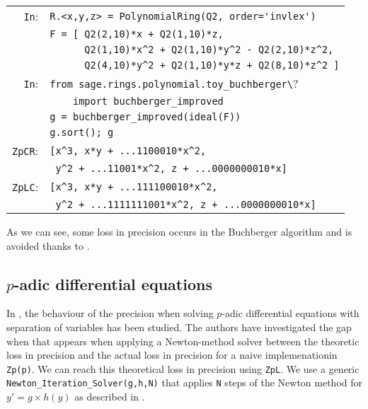 \documentclass[sigconf]{acmart}
\newcommand{\ZpFP}{\text{\color{output} \rm \tt ZpFP}\xspace}
\newcommand{\ZpL}{\text{\color{output} \rm \tt ZpL}\xspace}
\newcommand{\cIn}{{\color{input} \tt \phantom{Zp}In}:}
\newcommand{\cZpCR}{{\color{output} \tt ZpCR}:}
\newcommand{\cZpLC}{{\color{output} \tt ZpLC}:}
\theoremstyle{definition}
\begin{document}
{\noindent \small
\begin{tabular}{@{}rl}
\cIn
 & \verb?R.<x,y,z> = ?{\color{constructor}\verb?PolynomialRing?}\verb?(?{\color{ring}\verb?Q2?}\verb?, order=?{\color{string}\verb?'invlex'?}\verb?)? \\
 & \verb?F = [ ?{\color{ring}\verb?Q2?}\verb?(2,10)*x + ?{\color{ring}\verb?Q2?}\verb?(1,10)*z, ? \\
 & \verb?      ?{\color{ring}\verb?Q2?}\verb?(1,10)*x^2 + ?{\color{ring}\verb?Q2?}\verb?(1,10)*y^2 - ?{\color{ring}\verb?Q2?}\verb?(2,10)*z^2,? \\
 & \verb?      ?{\color{ring}\verb?Q2?}\verb?(4,10)*y^2 + ?{\color{ring}\verb?Q2?}\verb?(1,10)*y*z + ?{\color{ring}\verb?Q2?}\verb?(8,10)*z^2 ]? \\
\cIn
 & {\color{keyword}\verb?from?}\verb? sage.rings.polynomial.toy_buchberger\?\\
 & \verb?    ?{\color{keyword}\verb?import?}\verb? ?{\color{function}\verb?buchberger_improved?} \\
 & \verb?g = ?{\color{function}\verb?buchberger_improved?}\verb?(ideal(F))? \\
 & \verb?g.?{\color{method}\verb?sort?}\verb?(); g? \\
\cZpCR
 & \verb?[x^3, x*y + ...1100010*x^2,? \\
 & \verb? y^2 + ...11001*x^2, z + ...0000000010*x]? \\
\cZpLC
 & \verb?[x^3, x*y + ...111100010*x^2,? \\
 & \verb? y^2 + ...1111111001*x^2, z + ...0000000010*x]? \\
\end{tabular}}

\smallskip

As we can see, some loss in precision occurs in the
Buchberger algorithm and is avoided thanks to \ZpL.

\subsection{$p$-adic differential equations}

In \cite{LV16}, the behaviour of the precision when solving
$p$-adic differential equations with separation of 
variables has been studied.
The authors have investigated the gap when that appears
when applying a Newton-method solver between
the theoretic loss in precision and the 
actual loss in precision for a naive implemenationin \verb?Zp(p)?.
We can reach this theoretical loss in precision using \verb?ZpL?.
We use a generic {\color{function}\verb?Newton_Iteration_Solver?}\verb?(g,h,N)?
that applies \verb?N? steps of the Newton method for 
$y'=g \times h(y)$ as described in \citep{LV16}. 
\end{document}
